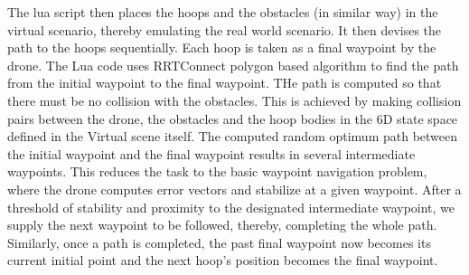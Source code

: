 The lua script then places the hoops and the obstacles (in similar way) in the virtual scenario, thereby emulating the real world scenario. It then devises the path to the hoops sequentially. Each hoop is taken as a final waypoint by the drone. The Lua code uses RRTConnect polygon based algorithm to find the path from the initial waypoint to the final waypoint. THe path is computed so that there must be no collision with the obstacles. This is achieved by making collision pairs between the drone, the obstacles and the hoop bodies in the 6D state space defined in the Virtual scene itself. The computed random optimum path between the initial waypoint and the final waypoint results in several intermediate waypoints. This reduces the task to the basic waypoint navigation problem, where the drone computes error vectors and stabilize at a given waypoint. After a threshold of stability and proximity to the designated intermediate waypoint, we supply the next waypoint to be followed, thereby, completing the whole path. Similarly, once a path is completed, the past final waypoint now becomes its current initial point and the next hoop's position becomes the final waypoint. 
\\

